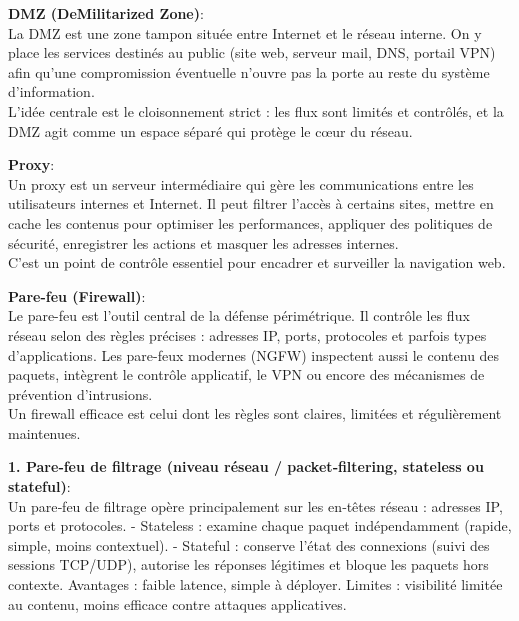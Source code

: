\medskip

\noindent \textbf{DMZ (DeMilitarized Zone)}:\\
La DMZ est une zone tampon située entre Internet et le réseau interne. On y place les services destinés au public (site web, serveur mail, DNS, portail VPN) afin qu’une compromission éventuelle n’ouvre pas la porte au reste du système d’information.\\
L’idée centrale est le cloisonnement strict : les flux sont limités et contrôlés, et la DMZ agit comme un espace séparé qui protège le cœur du réseau.

\medskip

\noindent \textbf{Proxy}:\\
Un proxy est un serveur intermédiaire qui gère les communications entre les utilisateurs internes et Internet. Il peut filtrer l’accès à certains sites, mettre en cache les contenus pour optimiser les performances, appliquer des politiques de sécurité, enregistrer les actions et masquer les adresses internes.\\
C’est un point de contrôle essentiel pour encadrer et surveiller la navigation web.

\medskip

\noindent \textbf{Pare-feu (Firewall)}:\\
Le pare-feu est l’outil central de la défense périmétrique. Il contrôle les flux réseau selon des règles précises : adresses IP, ports, protocoles et parfois types d’applications. Les pare-feux modernes (NGFW) inspectent aussi le contenu des paquets, intègrent le contrôle applicatif, le VPN ou encore des mécanismes de prévention d’intrusions.\\
Un firewall efficace est celui dont les règles sont claires, limitées et régulièrement maintenues.

\medskip

\noindent \textbf{1. Pare‑feu de filtrage (niveau réseau / packet‑filtering, stateless ou stateful)}:\\
Un pare‑feu de filtrage opère principalement sur les en‑têtes réseau : adresses IP, ports et protocoles.  
- Stateless : examine chaque paquet indépendamment (rapide, simple, moins contextuel).  
- Stateful : conserve l'état des connexions (suivi des sessions TCP/UDP), autorise les réponses légitimes et bloque les paquets hors contexte.  
Avantages : faible latence, simple à déployer. Limites : visibilité limitée au contenu, moins efficace contre attaques applicatives.

\newpage

